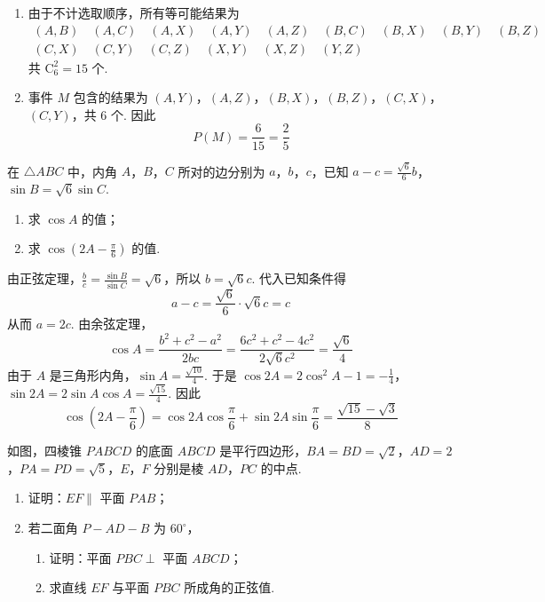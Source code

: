 \begin{solution}
\begin{enumerate}
\item 由于不计选取顺序，所有等可能结果为
\[
\begin{gathered}
(A,B)\quad(A,C)\quad(A,X)\quad(A,Y)\quad(A,Z)\quad(B,C)\quad(B,X)\quad(B,Y)\quad(B,Z)\quad\\
(C,X)\quad(C,Y)\quad(C,Z)\quad(X,Y)\quad(X,Z)\quad(Y,Z)\quad
\end{gathered}
\]
共 \(\mathrm C_6^2=15\) 个.
\item 事件 \(M\) 包含的结果为 \((A,Y)\)，\((A,Z)\)，\((B,X)\)，\((B,Z)\)，\((C,X)\)，\((C,Y)\)，共 \(6\) 个. 因此
\[
P(M)=\frac6{15}=\frac25
\]
\end{enumerate}
\end{solution}

\begin{problem}
在 \(\triangle ABC\) 中，内角 \(A\)，\(B\)，\(C\) 所对的边分别为 \(a\)，\(b\)，\(c\)，已知 \(a - c = \frac{\sqrt{6}}{6} b\)，\(\sin B = \sqrt{6} \sin C\).

\begin{enumerate}
\item 求 \(\cos A\) 的值；
\item 求 \( \cos\left(2A-\frac{\pi}{6}\right) \) 的值.
\end{enumerate}
\end{problem}

\begin{solution}
由正弦定理，\(\frac b c=\frac{\sin B}{\sin C}=\sqrt6\)，所以 \(b=\sqrt6c\). 代入已知条件得
\[
a-c=\frac{\sqrt6}{6}\cdot\sqrt6c=c
\]
从而 \(a=2c\). 由余弦定理，
\[
\cos A=\frac{b^2+c^2-a^2}{2bc}=\frac{6c^2+c^2-4c^2}{2\sqrt6c^2}=\frac{\sqrt6}{4}
\]
由于 \(A\) 是三角形内角，\(\sin A=\frac{\sqrt{10}}4\). 于是
\(\cos2A=2\cos^2A-1=-\frac14\)，\(\sin2A=2\sin A\cos A=\frac{\sqrt{15}}4\).
因此
\[
\cos\left(2A-\frac\pi6\right)=\cos2A\cos\frac\pi6+\sin2A\sin\frac\pi6=\frac{\sqrt{15}-\sqrt3}{8}
\]
\end{solution}

\begin{problem}
如图，四棱锥 \(PABCD\) 的底面 \(ABCD\) 是平行四边形，\(BA = BD = \sqrt{2}\)，\(AD = 2\)，\(PA = PD = \sqrt{5}\)，\(E\)，\(F\) 分别是棱 \(AD\)，\(PC\) 的中点.

\begin{enumerate}
\item 证明：\(EF \parallel\) 平面 \(PAB\)；
\item 若二面角 \(P - AD - B\) 为 \(60^{\circ}\)，

\begin{enumerate}
\item 证明：平面 \(PBC \perp\) 平面 \(ABCD\)；
\item 求直线 \(EF\) 与平面 \(PBC\) 所成角的正弦值.
\end{enumerate}
\end{enumerate}

\end{problem}

